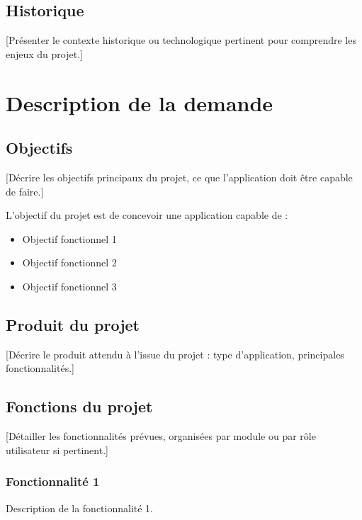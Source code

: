 \documentclass[12pt, a4paper]{article}
\begin{document}
\subsection{Historique}

[Présenter le contexte historique ou technologique pertinent pour comprendre
les enjeux du projet.]

\section{Description de la demande}

\subsection{Objectifs}

[Décrire les objectifs principaux du projet, ce que l'application doit être
capable de faire.]

L'objectif du projet est de concevoir une application capable de :
\begin{itemize}
  \item Objectif fonctionnel 1
  \item Objectif fonctionnel 2
  \item Objectif fonctionnel 3
\end{itemize}

\subsection{Produit du projet}

[Décrire le produit attendu à l'issue du projet : type d'application,
principales fonctionnalités.]

\subsection{Fonctions du projet}

[Détailler les fonctionnalités prévues, organisées par module ou par rôle
utilisateur si pertinent.]

\subsubsection{Fonctionnalité 1}

Description de la fonctionnalité 1.
\end{document}
